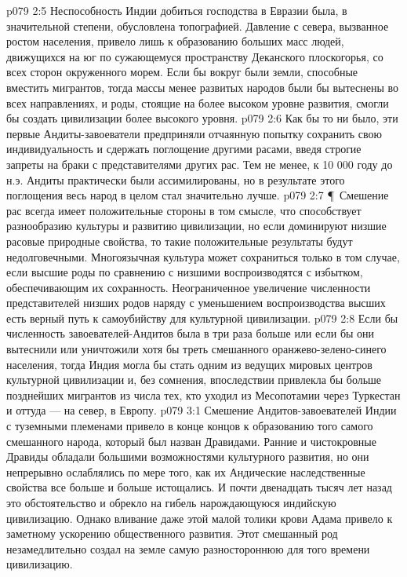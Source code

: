 \vs p079 2:5 Неспособность Индии добиться господства в Евразии была, в значительной степени, обусловлена топографией. Давление с севера, вызванное ростом населения, привело лишь к образованию больших масс людей, движущихся на юг по сужающемуся пространству Деканского плоскогорья, со всех сторон окруженного морем. Если бы вокруг были земли, способные вместить мигрантов, тогда массы менее развитых народов были бы вытеснены во всех направлениях, и роды, стоящие на более высоком уровне развития, смогли бы создать цивилизации более высокого уровня.
\vs p079 2:6 Как бы то ни было, эти первые Андиты\hyp{}завоеватели предприняли отчаянную попытку сохранить свою индивидуальность и сдержать поглощение другими расами, введя строгие запреты на браки с представителями других рас. Тем не менее, к 10 000 году до н.э. Андиты практически были ассимилированы, но в результате этого поглощения весь народ в целом стал значительно лучше.
\vs p079 2:7 \P\ Смешение рас всегда имеет положительные стороны в том смысле, что способствует разнообразию культуры и развитию цивилизации, но если доминируют низшие расовые природные свойства, то такие положительные результаты будут недолговечными. Многоязычная культура может сохраниться только в том случае, если высшие роды по сравнению с низшими воспроизводятся с избытком, обеспечивающим их сохранность. Неограниченное увеличение численности представителей низших родов наряду с уменьшением воспроизводства высших есть верный путь к самоубийству для культурной цивилизации.
\vs p079 2:8 Если бы численность завоевателей\hyp{}Андитов была в три раза больше или если бы они вытеснили или уничтожили хотя бы треть смешанного оранжево\hyp{}зелено\hyp{}синего населения, тогда Индия могла бы стать одним из ведущих мировых центров культурной цивилизации и, без сомнения, впоследствии привлекла бы больше позднейших мигрантов из числа тех, кто уходил из Месопотамии через Туркестан и оттуда --- на север, в Европу.
\vs p079 3:1 Смешение Андитов\hyp{}завоевателей Индии с туземными племенами привело в конце концов к образованию того самого смешанного народа, который был назван Дравидами. Ранние и чистокровные Дравиды обладали большими возможностями культурного развития, но они непрерывно ослаблялись по мере того, как их Андические наследственные свойства все больше и больше истощались. И почти двенадцать тысяч лет назад это обстоятельство и обрекло на гибель нарождающуюся индийскую цивилизацию. Однако вливание даже этой малой толики крови Адама привело к заметному ускорению общественного развития. Этот смешанный род незамедлительно создал на земле самую разностороннюю для того времени цивилизацию.

